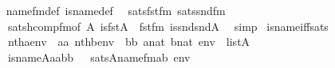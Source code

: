 \begin{isabellebody}
%
\isadelimproof
\ \ %
\endisadelimproof
%
\isatagproof
{}\isamarkupfalse%
\ name{}{\isacharunderscore}{\kern0pt}fm{\isacharunderscore}{\kern0pt}def\ is{\isacharunderscore}{\kern0pt}name{}{\isacharunderscore}{\kern0pt}def\ \isamarkupfalse%
\ sats{\isacharunderscore}{\kern0pt}fst{\isacharunderscore}{\kern0pt}fm\ sats{\isacharunderscore}{\kern0pt}snd{}{\isacharunderscore}{\kern0pt}fm\isanewline
\ \ \ \ sats{\isacharunderscore}{\kern0pt}hcomp{\isacharunderscore}{\kern0pt}fm{\isacharbrackleft}{\kern0pt}of\ A\ {\isachardoublequoteopen}is{\isacharunderscore}{\kern0pt}fst{\isacharparenleft}{\kern0pt}{\isacharhash}{\kern0pt}{\isacharhash}{\kern0pt}A{\isacharparenright}{\kern0pt}{\isachardoublequoteclose}\ {\isacharunderscore}{\kern0pt}\ fst{\isacharunderscore}{\kern0pt}fm\ {\isachardoublequoteopen}is{\isacharunderscore}{\kern0pt}snd{\isacharunderscore}{\kern0pt}snd{\isacharparenleft}{\kern0pt}{\isacharhash}{\kern0pt}{\isacharhash}{\kern0pt}A{\isacharparenright}{\kern0pt}{\isachardoublequoteclose}{\isacharbrackright}{\kern0pt}\ \isamarkupfalse%
\ simp%
\endisatagproof
{\isafoldproof}%
%
\isadelimproof
\isanewline
%
\endisadelimproof
\isanewline
{}\isamarkupfalse%
\ is{\isacharunderscore}{\kern0pt}name{}{\isacharunderscore}{\kern0pt}iff{\isacharunderscore}{\kern0pt}sats{\isacharcolon}{\kern0pt}\isanewline
\ \ \isanewline
\ \ \ \ {\isachardoublequoteopen}nth{\isacharparenleft}{\kern0pt}a{\isacharcomma}{\kern0pt}env{\isacharparenright}{\kern0pt}\ {\isacharequal}{\kern0pt}\ aa{\isachardoublequoteclose}\ {\isachardoublequoteopen}nth{\isacharparenleft}{\kern0pt}b{\isacharcomma}{\kern0pt}env{\isacharparenright}{\kern0pt}\ {\isacharequal}{\kern0pt}\ bb{\isachardoublequoteclose}\ {\isachardoublequoteopen}a{\isasymin}nat{\isachardoublequoteclose}\ {\isachardoublequoteopen}b{\isasymin}nat{\isachardoublequoteclose}\ {\isachardoublequoteopen}env\ {\isasymin}\ list{\isacharparenleft}{\kern0pt}A{\isacharparenright}{\kern0pt}{\isachardoublequoteclose}\isanewline
\ \ \isanewline
\ \ \ \ {\isachardoublequoteopen}is{\isacharunderscore}{\kern0pt}name{}{\isacharparenleft}{\kern0pt}{\isacharhash}{\kern0pt}{\isacharhash}{\kern0pt}A{\isacharcomma}{\kern0pt}aa{\isacharcomma}{\kern0pt}bb{\isacharparenright}{\kern0pt}\ \ {\isasymlongleftrightarrow}\ sats{\isacharparenleft}{\kern0pt}A{\isacharcomma}{\kern0pt}name{}{\isacharunderscore}{\kern0pt}fm{\isacharparenleft}{\kern0pt}a{\isacharcomma}{\kern0pt}b{\isacharparenright}{\kern0pt}{\isacharcomma}{\kern0pt}\ env{\isacharparenright}{\kern0pt}{\isachardoublequoteclose}\isanewline

\end{isabellebody}
